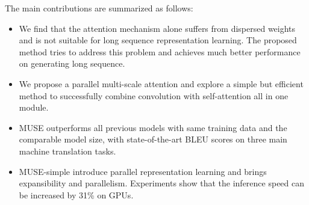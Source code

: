 \documentclass{article} %
\begin{document}


The main contributions are summarized as follows:
\begin{itemize}

\item We find that the attention mechanism alone suffers from dispersed weights and is not suitable for long sequence representation learning. The proposed method tries to address this problem and achieves much better performance on generating long sequence.

\item We propose a parallel multi-scale attention and explore a simple but efficient method to successfully combine convolution with self-attention all in one module. 

\item MUSE outperforms all previous models with same training data and the comparable model size, with state-of-the-art BLEU scores on three main machine translation tasks. 

\item MUSE-simple introduce parallel representation learning  and brings expansibility and parallelism. Experiments show that the inference speed can be increased by 31\% on GPUs.
\end{itemize}

\end{document}
